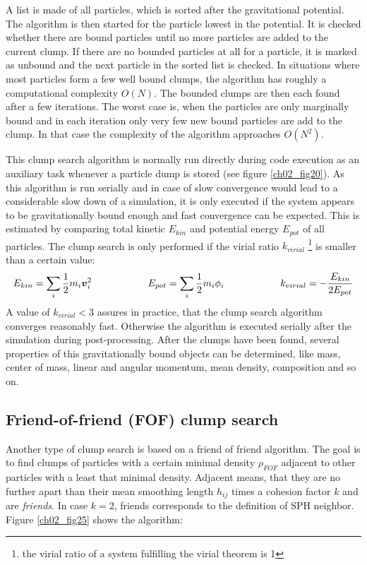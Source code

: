 A list is made of all particles, which is sorted after the gravitational potential. The algorithm is then started for the particle lowest in the potential. It is checked whether there are bound particles until no more particles are added to the current clump. If there are no bounded particles at all for a particle, it is marked as unbound and the next particle in the sorted list is checked. In situations where most particles form a few well bound clumps, the algorithm has roughly a computational complexity $O(N)$. The bounded clumps are then each found after a few iterations. The worst case is, when the particles are only marginally bound and in each iteration only very few new bound particles are add to the clump. In that case the complexity of the algorithm approaches $O(N^2)$. 

This clump search algorithm is normally run directly during code execution as an auxiliary task whenever a particle dump is stored (see figure \ref{ch02_fig20}). As this algorithm is run serially and in case of slow convergence would lead to a considerable slow down of a simulation, it is only executed if the system appears to be gravitationally bound enough and fast convergence can be expected. This is estimated by comparing total kinetic $E_{kin}$ and potential energy $E_{pot}$ of all particles. The clump search is only performed if the virial ratio $k_{virial}$ \footnote{the virial ratio of a system fulfilling the virial theorem is 1} is smaller than a certain value:
\begin{align}
\label{ch02_aux_eq015}
E_{kin} = \sum_i \frac{1}{2} m_i \boldsymbol{v}_i^2 \hspace{2.0cm} E_{pot} = \sum_i \frac{1}{2} m_i \phi_i \hspace{2.0cm} k_{virial} = - \frac{E_{kin}}{2 E_{pot}}
\end{align}
A value of $k_{virial} < 3$ assures in practice, that the clump search algorithm converges reasonably fast. Otherwise the algorithm is executed serially after the simulation during post-processing. After the clumps have been found, several properties of this gravitationally bound objects can be determined, like mass, center of mass, linear and angular momentum, mean density, composition and so on.

\subsection{Friend-of-friend (FOF) clump search}
\label{ch02_sec04_ss06}
Another type of clump search is based on a friend of friend algorithm. The goal is to find clumps of particles with a certain minimal density $\rho_{FOF}$ adjacent to other particles with a least that minimal density. Adjacent means, that they are no further apart than their mean smoothing length $h_{ij}$ times a cohesion factor $k$ and are \emph{friends}. In case $k=2$, friends corresponds to the definition of SPH neighbor. Figure \ref{ch02_fig25} shows the algorithm:

